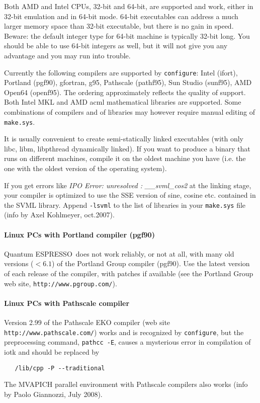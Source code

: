 \documentclass[12pt,a4paper]{article}
\def\qe{{\sc Quantum ESPRESSO}}
\def\configure{\texttt{configure}}
\begin{document}
Both AMD and Intel CPUs, 32-bit and 64-bit, are supported and work,
either in 32-bit emulation and in 64-bit mode. 64-bit executables 
can address a much larger memory space than 32-bit executable, but
there is no gain in speed.
Beware: the default integer type for 64-bit machine is typically
32-bit long. You should be able to use 64-bit integers as well, 
but it will not give you any advantage and you may run into trouble.

Currently the following compilers are supported by \configure:
Intel (ifort), Portland (pgf90), gfortran, g95, Pathscale (pathf95), 
Sun Studio (sunf95),  AMD Open64 (openf95). The ordering approximately
reflects the quality of support. Both Intel MKL and AMD acml mathematical
libraries are supported. Some combinations of compilers and of libraries
may however require manual editing of \texttt{make.sys}.

It is usually convenient to create semi-statically linked executables (with only
libc, libm, libpthread dynamically linked). If you want to produce a binary
that runs on different machines, compile it on the oldest machine you have
(i.e. the one with the oldest version of the operating system).

If you get errors like {\em IPO Error: unresolved : \_\_svml\_cos2}
at the linking stage, your compiler is optimized to use the SSE
version of sine, cosine etc. contained in the SVML library. Append
\texttt{-lsvml} to the list of libraries in your \texttt{make.sys} file (info by Axel
Kohlmeyer, oct.2007). 

\paragraph{Linux PCs with Portland compiler (pgf90)}

\qe\ does not work reliably, or not at all, with many old
versions ($< 6.1$) of the Portland Group compiler (pgf90).
 Use the latest version of each 
release of the compiler, with patches if available (see
the Portland Group web site, \texttt{http://www.pgroup.com/}).

\paragraph{Linux PCs with Pathscale compiler}

Version 2.99 of the Pathscale EKO compiler (web site
\texttt{http://www.pathscale.com/})
works and is recognized by
\configure, but the preprocessing command, \texttt{pathcc -E},
causes a mysterious error in compilation of iotk and should be replaced by
\begin{verbatim}
   /lib/cpp -P --traditional
\end{verbatim}
The MVAPICH parallel environment with Pathscale compilers also works
(info by Paolo Giannozzi, July 2008). 
\end{document}
